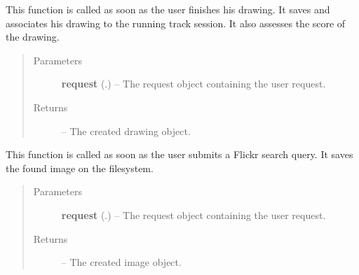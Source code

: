 \documentclass[letterpaper,10pt,english]{sphinxmanual}
\begin{document}

\begin{fulllineitems}
\label{Contour.contour:Contour.contour.views.handle_finished_drawing}
This function is called as soon as the user finishes his drawing. It saves and associates his drawing to the running track session. It also assesses the score of the drawing.
\begin{quote}\begin{description}
\item[{Parameters}] \leavevmode
\textbf{request} (.) -- The request object containing the user request.

\item[{Returns}] \leavevmode
{} -- The created drawing object.

\end{description}\end{quote}

\end{fulllineitems}


\begin{fulllineitems}
\label{Contour.contour:Contour.contour.views.handle_flickr_search}
This function is called as soon as the user submits a Flickr search query. It saves the found image on the filesystem.
\begin{quote}\begin{description}
\item[{Parameters}] \leavevmode
\textbf{request} (.) -- The request object containing the user request.

\item[{Returns}] \leavevmode
{} -- The created image object.

\end{description}\end{quote}

\end{fulllineitems}

\end{document}
